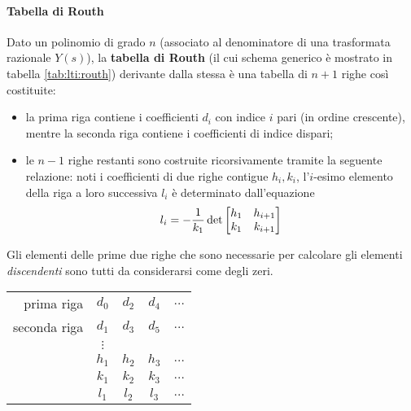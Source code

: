 		\paragraph{Tabella di Routh} Dato un polinomio di grado $n$ (associato al denominatore di una trasformata razionale $Y(s)$), la \textbf{tabella di Routh} (il cui schema generico è mostrato in tabella \ref{tab:lti:routh}) derivante dalla stessa è una tabella di $n+1$ righe così costituite:
		\begin{itemize}
			\item la prima riga contiene i coefficienti $d_i$ con indice $i$ pari (in ordine crescente), mentre la seconda riga contiene i coefficienti di indice dispari;
			\item le $n-1$ righe restanti sono costruite ricorsivamente tramite la seguente relazione: noti i coefficienti di due righe contigue $h_i,k_i$, l'$i$-esimo elemento della riga a loro successiva $l_i$ è determinato dall'equazione
			\[ l_i = - \frac 1{k_1}\det \begin{bmatrix} h_1 & h_{i+1} \\ k_1 & k_{i+1} \end{bmatrix} \]
		\end{itemize}
		Gli elementi delle prime due righe che sono necessarie per calcolare gli elementi \textit{discendenti} sono tutti da considerarsi come degli zeri.
		\begin{SCtable}[1][bht]
			\centering
			\begin{tabular}{r | c c c c| }
				prima riga & $d_0$ & $d_2$ & $d_4$ & $\dots$ \\
				seconda riga & $d_1$ & $d_3$ & $d_5$ & $\dots$ \\
				& $\vdots$ \\
				& $h_1$ & $h_2$ & $h_3$ & $\dots$ \\
				& $k_1$ & $k_2$ & $k_3$ & $\dots$ \\
				& $l_1$ & $l_2$ & $l_3$ & $\dots$ \\
			\end{tabular}
			\caption{schema di riferimento della tabella di Routh.} \label{tab:lti:routh}
		\end{SCtable}
		
